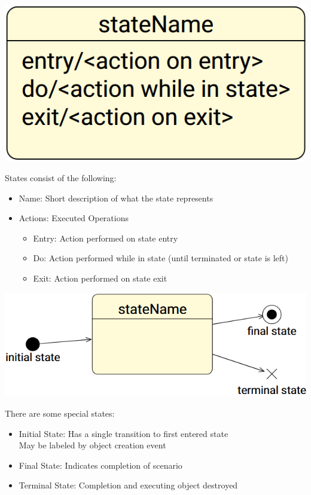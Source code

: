 \documentclass[
../../Software_Engineering_Summary.tex,
]
{subfiles}
\begin{document}
\begin{defbox}
    \begin{center}
        \includegraphics[scale=0.3]{Pics/BehaviourBasicStates.png}
    \end{center}
    States consist of the following:
    \begin{itemize}
        \item Name: Short description of what the state represents
        \item Actions: Executed Operations
        \begin{itemize}
            \item Entry: Action performed on state entry
            \item Do: Action performed while in state (until terminated or state is left)
            \item Exit: Action performed on state exit
        \end{itemize}
    \end{itemize}
\end{defbox}

\begin{defbox}
    \begin{center}
        \includegraphics[scale=0.5]{Pics/BehaviourSpecialStates.png}
    \end{center}
    There are some special states:
    \begin{itemize}
        \item Initial State: Has a single transition to first entered state \\
        May be labeled by object creation event
        \item Final State: Indicates completion of scenario
        \item Terminal State: Completion and executing object destroyed
    \end{itemize}
\end{defbox}
\end{document}
